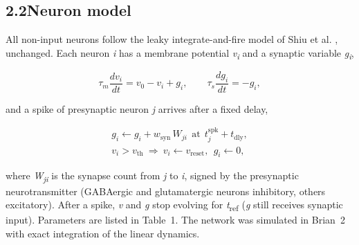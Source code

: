 \documentclass[11pt,letterpaper]{article}
\begin{document}
\subsection{\texorpdfstring{2.2\quad Neuron
model}{2.2Neuron model}}\label{neuron-model}

\noindent All non-input neurons follow the leaky integrate-and-fire
model of Shiu et al. \cite{shiu2024}, unchanged. Each neuron \emph{i}
has a membrane potential \emph{v}\textsubscript{\emph{i}} and a synaptic
variable \emph{g}\textsubscript{\emph{i}},

\[\tau_m\frac{dv_i}{dt}=v_0-v_i+g_i,\qquad \tau_s\frac{dg_i}{dt}=-g_i,\tag{2}\]

\noindent and a spike of presynaptic neuron \emph{j} arrives after a
fixed delay,

\[\begin{gathered}g_i\leftarrow g_i+w_{\mathrm{syn}}\,W_{ji}\ \ \text{at}\ \ t_j^{\mathrm{spk}}+t_{\mathrm{dly}},\\ v_i>v_{\mathrm{th}}\ \Rightarrow\ v_i\leftarrow v_{\mathrm{reset}},\ \ g_i\leftarrow 0,\end{gathered}\tag{3}\]

\noindent where \emph{W\textsubscript{ji}} is the synapse count from
\emph{j} to \emph{i}, signed by the presynaptic neurotransmitter
(GABAergic and glutamatergic neurons inhibitory, others excitatory).
After a spike, \emph{v} and \emph{g} stop evolving for
\emph{t}\textsubscript{ref} (\emph{g} still receives synaptic input).
Parameters are listed in Table~1. The network was simulated in Brian~2
with exact integration of the linear dynamics.
\end{document}
